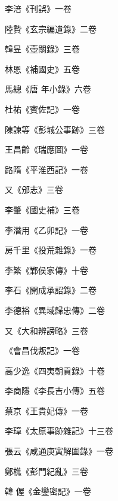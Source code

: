 \begin{pinyinscope}
 李涪《刊誤》一卷



 陸贄《玄宗編遺錄》二卷



 韓昱《壺關錄》三卷



 林恩《補國史》五卷



 馬總《唐
 年小錄》六卷



 杜祐《賓佐記》一卷



 陳諫等《彭城公事跡》三卷



 王昌齡《瑞應圖》一卷



 路隋《平淮西記》一卷



 又《邠志》三卷



 李肇《國史補》三卷



 李潛用《乙卯記》一卷



 房千里《投荒雜錄》一卷



 李繁《鄴侯家傳》十卷



 李石《開成承詔錄》二卷



 李德裕《異域歸忠傳》二卷



 又《大和辨謗略》三卷



 《會昌伐叛記》一卷



 高少逸《四夷朝貢錄》十卷



 李商隱《李長吉小傳》五卷



 蔡京《王貴妃傳》一卷



 李璋《太原事跡雜記》十三卷



 張云《咸通庚寅解圍錄》一卷



 鄭樵《彭門紀亂》三卷



 韓
 偓《金鑾密記》一卷




\end{pinyinscope}

